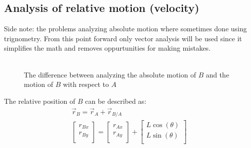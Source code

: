 \documentclass[11pt, a4paper]{article}
\begin{document}
\subsection{Analysis of relative motion (velocity)}
Side note: the problems analyzing absolute motion where sometimes done using trignometry. From this point forward only vector analysis will be used since it simplifies the math and removes oppurtunities for making mistakes.\\
\\
\begin{figure}[h]
  \centering
  \qquad \qquad \qquad
  \caption{The difference between analyzing the absolute motion of $B$ and the motion of $B$ with respect to $A$}
\end{figure}
The relative position of $B$ can be described as:
\begin{gather}
  \vec{r}_B = \vec{r}_A + \vec{r}_{B/A}\\
  \begin{bmatrix} r_{Bx}\\ r_{By}\\ \end{bmatrix} = \begin{bmatrix} r_{Ax}\\ r_{Ay}\\ \end{bmatrix} + \begin{bmatrix} L\cos(\theta)\\ L\sin(\theta)\\ \end{bmatrix} 
\end{gather}
\end{document}

